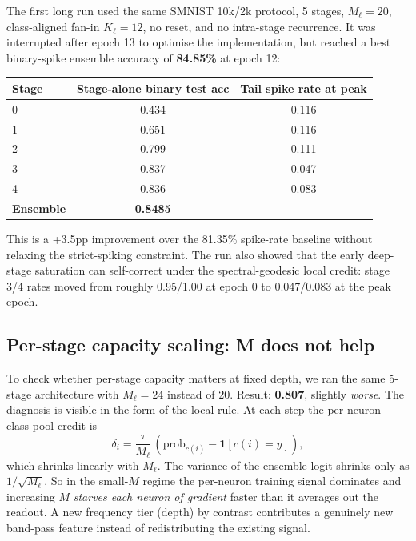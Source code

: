 \documentclass[11pt]{article}
\begin{document}
The first long run used the same SMNIST 10k/2k protocol, 5 stages,
$M_\ell=20$, class-aligned fan-in $K_\ell=12$, no reset, and no
intra-stage recurrence.  It was interrupted after epoch 13 to optimise
the implementation, but reached a best binary-spike ensemble accuracy
of \textbf{84.85\%} at epoch 12:

\begin{center}
\captionsetup{type=table}
\begin{tabular}{@{}lcc@{}}
\toprule
Stage & Stage-alone binary test acc & Tail spike rate at peak \\
\midrule
0 & 0.434 & 0.116 \\
1 & 0.651 & 0.116 \\
2 & 0.799 & 0.111 \\
3 & 0.837 & 0.047 \\
4 & 0.836 & 0.083 \\
\midrule
\textbf{Ensemble} & \textbf{0.8485} & --- \\
\bottomrule
\end{tabular}
\end{center}

This is a +3.5pp improvement over the 81.35\% spike-rate baseline
without relaxing the strict-spiking constraint.  The run also showed
that the early deep-stage saturation can self-correct under the
spectral-geodesic local credit: stage 3/4 rates moved from roughly
0.95/1.00 at epoch 0 to 0.047/0.083 at the peak epoch.

\subsection{Per-stage capacity scaling: M does not help}

To check whether per-stage capacity matters at fixed depth, we ran
the same 5-stage architecture with $M_\ell = 24$ instead of 20.
Result: \textbf{0.807}, slightly \emph{worse}. The diagnosis is
visible in the form of the local rule. At each step the per-neuron
class-pool credit is
\[
\delta_i = \frac{\tau}{M_\ell}\,(\text{prob}_{c(i)} - \mathbf{1}[c(i)=y]),
\]
which shrinks linearly with $M_\ell$. The variance of the ensemble
logit shrinks only as $1/\sqrt{M_\ell}$. So in the small-$M$ regime
the per-neuron training signal dominates and increasing $M$ \emph{starves
each neuron of gradient} faster than it averages out the readout.
A new frequency tier (depth) by contrast contributes a genuinely new
band-pass feature instead of redistributing the existing signal.
\end{document}
